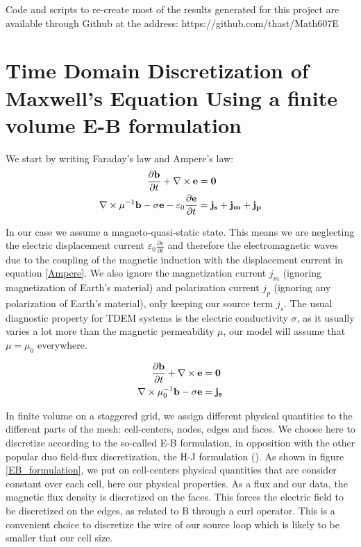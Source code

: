 \documentclass[twoside]{article}
\begin{document}
Code and scripts to re-create most of the results generated for this project are available through Github at the address: 
https://github.com/thast/Math607E


\section{Time Domain Discretization of Maxwell's Equation Using a finite volume E-B formulation}

We start by writing Faraday's law and Ampere's law:
\begin{align}
\frac{ \partial {\bf b}}{\partial t} + \nabla \times {\bf e} &= {\bf 0} \label{Faraday} \\
\nabla \times \mu^{-1}{\bf b} - \sigma {\bf e} - \varepsilon_0 \frac{\partial {\bf e}}{\partial t} &= \bf{j_s} + \bf{j_m} + \bf{j_p} \label{Ampere}
\end{align}

In our case we assume a magneto-quasi-static state. This means we are neglecting the electric displacement current $\varepsilon_0 \frac{\partial e}{\partial t}$ and therefore the electromagnetic waves due to the coupling of the magnetic induction with the displacement current in equation \ref{Ampere}. We also ignore the magnetization current $j_m$ (ignoring magnetization of Earth's material) and polarization current $j_p$ (ignoring any polarization of Earth's material), only keeping our source term $j_s$. The usual diagnostic property for TDEM systems is the electric conductivity $\sigma$, as it usually varies a lot more than the magnetic permeability $\mu$, our model will assume that $\mu = \mu_0$ everywhere.

\begin{align}
\frac{ \partial {\bf b}}{\partial t} + \nabla \times {\bf e} &= {\bf 0} \\
\nabla \times \mu_0^{-1}{\bf b} - \sigma {\bf e} &= {\bf {j_s}} \label{Ampere_quasistatic}
\end{align}

In finite volume on a staggered grid, we assign different physical quantities to the different parts of the mesh: cell-centers, nodes, edges and faces. We choose here to discretize according to the so-called E-B formulation, in opposition with the other popular duo field-flux discretization, the H-J formulation (\cite{simpegjournal}). As shown in figure \ref{EB_formulation}, we put on cell-centers physical quantities that are consider constant over each cell, here our physical properties. As a flux and our data, the magnetic flux density is discretized on the faces. This forces the electric field to be discretized on the edges, as related to B through a curl operator. This is a convenient choice to discretize the wire of our source loop which is likely to be smaller that our cell size.
\end{document}
